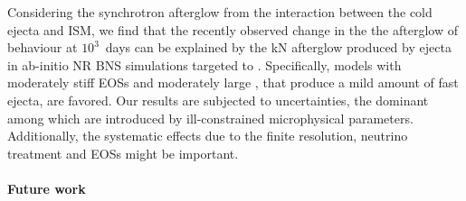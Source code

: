Considering the synchrotron afterglow from the interaction between the cold  ejecta and 
\ac{ISM}, we find that the recently observed change in the the afterglow of \GRB{} behaviour 
at $10^3$~days can be explained by the \ac{kN} afterglow produced by ejecta in 
ab-initio \ac{NR} \ac{BNS} simulations targeted to \GW{}. 
%
Specifically, models with moderately stiff \acp{EOS} and moderately large \mr{}, 
that produce a mild amount of fast ejecta, are favored.
%
Our results are subjected to uncertainties, the dominant among which are introduced 
by ill-constrained microphysical parameters. 
Additionally, the systematic effects due to the finite resolution, neutrino treatment 
and \acp{EOS} might be important. 


\paragraph{Future work}

